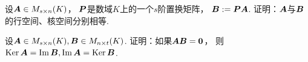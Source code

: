 \begin{example}
设\(\vb{A} \in M_{s \times n}(K)\)，
\(\vb{P}\)是数域\(K\)上的一个\(s\)阶置换矩阵，
\(\vb{B} \defeq \vb{P} \vb{A}\).
证明：\(\vb{A}\)与\(\vb{B}\)的行空间、核空间分别相等.

\end{example}

\begin{example}
设\(\vb{A} \in M_{s \times n}(K), \vb{B} \in M_{n \times t}(K)\).
证明：如果\(\vb{A} \vb{B} = \vb0\)，
则\(\Ker\vb{A} = \Img\vb{B}, \Img\vb{A} = \Ker\vb{B}\).
\end{example}

